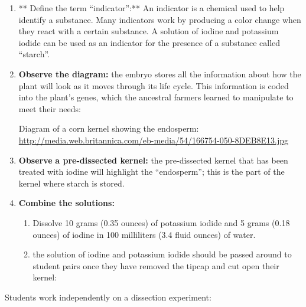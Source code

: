 \documentclass[12pt,]{article}
\providecommand{\tightlist}{%
  \setlength{\itemsep}{0pt}\setlength{\parskip}{0pt}}
\begin{document}
\begin{enumerate}
\def\labelenumi{\arabic{enumi}.}
\item
  ** Define the term ``indicator'':** An indicator is a chemical used to help identify a substance. Many indicators work by producing a color change when they react with a certain substance. A solution of iodine and potassium iodide can be used as an indicator for the presence of a substance called ``starch''.
\item
  \textbf{Observe the diagram: }the embryo stores all the information about how the plant will look as it moves through its life cycle. This information is coded into the plant's genes, which the ancestral farmers learned to manipulate to meet their needs:

  Diagram of a corn kernel showing the endosperm: \url{http://media.web.britannica.com/eb-media/54/166754-050-8DEB8E13.jpg}
\item
  \textbf{Observe} \textbf{a pre-dissected kernel:} the pre-dissected kernel that has been treated with iodine will highlight the ``endosperm''; this is the part of the kernel where starch is stored.
\item
  \textbf{Combine the solutions: }

  \begin{enumerate}
  \def\labelenumii{\arabic{enumii}.}
  \tightlist
  \item
    Dissolve 10 grams (0.35 ounces) of potassium iodide and 5 grams (0.18 ounces) of iodine in 100 milliliters (3.4 fluid ounces) of water.
  \item
    the solution of iodine and potassium iodide should be passed around to student pairs once they have removed the tipcap and cut open their kernel:
  \end{enumerate}
\end{enumerate}

Students work independently on a dissection experiment:
\end{document}
